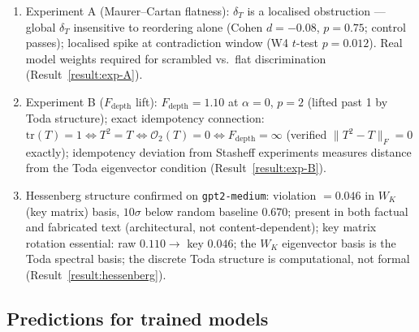 \documentclass[11pt]{amsart}
\theoremstyle{definition}
\begin{document}
\begin{enumerate}
  (Proposition~\ref{prop:toda}).
\item Experiment A (Maurer--Cartan flatness): $\delta_T$ is a localised
  obstruction --- global $\delta_T$ insensitive to reordering alone
  (Cohen $d = -0.08$, $p = 0.75$; control passes); localised spike at
  contradiction window (W4 $t$-test $p = 0.012$).
  Real model weights required for scrambled vs.\ flat discrimination
  (Result~\ref{result:exp-A}).
\item Experiment B ($F_\mathrm{depth}$ lift): $F_\mathrm{depth} = 1.10$ at
  $\alpha=0$, $p=2$ (lifted past 1 by Toda structure); exact idempotency
  connection: $\mathrm{tr}(T)=1 \iff T^2=T \iff \mathcal{O}_2(T)=0
  \iff F_\mathrm{depth}=\infty$ (verified $\|T^2-T\|_F = 0$ exactly);
  idempotency deviation from Stasheff experiments measures distance from
  the Toda eigenvector condition (Result~\ref{result:exp-B}).
\item Hessenberg structure confirmed on \texttt{gpt2-medium}:
  violation $= 0.046$ in $W_K$ (key matrix) basis,
  $10\sigma$ below random baseline $0.670$;
  present in both factual and fabricated text (architectural, not content-dependent);
  key matrix rotation essential: raw $0.110 \to$ key $0.046$;
  the $W_K$ eigenvector basis is the Toda spectral basis;
  the discrete Toda structure is computational, not formal
  (Result~\ref{result:hessenberg}).
\end{enumerate}

\subsection{Predictions for trained models}
\end{document}
